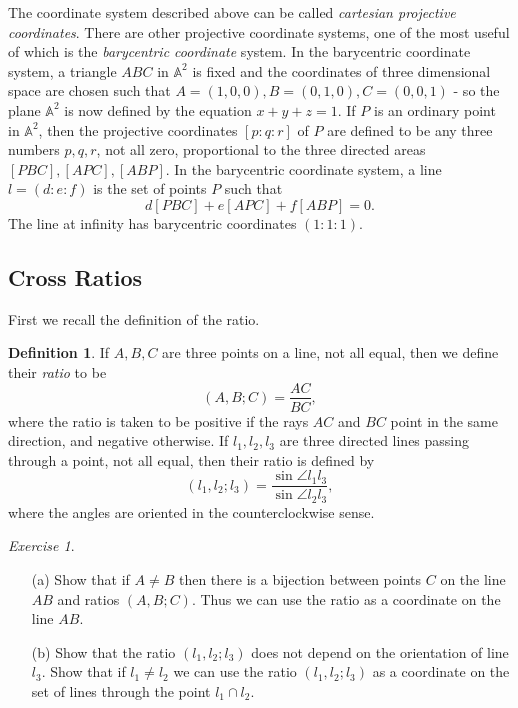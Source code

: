 \documentclass[letterpaper,11pt]{article}
\theoremstyle{definition}
\newtheorem{defn}{Definition}
\theoremstyle{remark}
\newtheorem{exer}{Exercise}
\begin{document}
The coordinate system described above can be called \emph{cartesian projective coordinates}. There are other projective coordinate systems, one of the most useful of which is the \emph{barycentric coordinate} system. In the barycentric coordinate system, a triangle $ABC$ in $\mathbb{A}^2$ is fixed and the coordinates of three dimensional space are chosen such that $A=(1,0,0), B = (0,1,0), C = (0,0,1)$ - so the plane $\mathbb{A}^2$ is now defined by the equation $x+y+z = 1$. If $P$ is an ordinary point in $\mathbb{A}^2$, then the projective coordinates $[p:q:r]$ of $P$ are defined to be any three numbers $p,q,r$, not all zero, proportional to the three directed areas $[PBC], [APC], [ABP]$. In the barycentric coordinate system, a line $l=(d:e:f)$ is the set of points $P$ such that
\[
d[PBC] + e[APC] + f[ABP] = 0.
\]
The line at infinity has barycentric coordinates $(1:1:1)$.

\subsection{Cross Ratios}

First we recall the definition of the ratio.

\begin{defn} If $A,B,C$ are three points on a line, not all equal, then we define their \emph{ratio} to be
\[
(A,B;C) = \frac{AC}{BC},
\]
where the ratio is taken to be positive if the rays $AC$ and $BC$ point in the same direction, and negative otherwise.
If $l_1,l_2,l_3$ are three directed lines passing through a point, not all equal, then their ratio is defined by
\[
(l_1,l_2;l_3) = \frac{\sin\angle l_1l_3}{\sin \angle l_2l_3},
\]
where the angles are oriented in the counterclockwise sense.
\end{defn}

\begin{exer}
\begin{itemize}
\item[(a)] Show that if $A\ne B$ then there is a bijection between points $C$ on the line $AB$ and ratios $(A,B;C)$. Thus we can use the ratio as a coordinate on the line $AB$.
\item[(b)] Show that the ratio $(l_1,l_2;l_3)$ does not depend on the orientation of line $l_3$. Show that if $l_1 \ne l_2$ we can use the ratio $(l_1,l_2;l_3)$ as a coordinate on the set of lines through the point $l_1\cap l_2$.
\end{itemize}
\end{exer}
\end{document}
